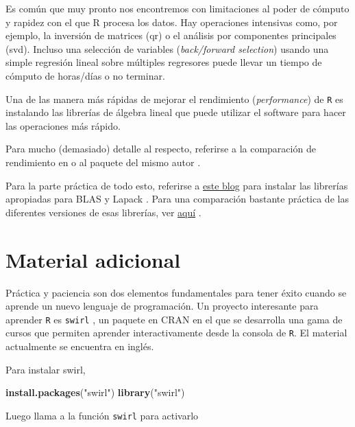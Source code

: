 \documentclass[]{article}
\newenvironment{Shaded}{\begin{snugshade}}{\end{snugshade}}
\newcommand{\KeywordTok}[1]{\textcolor[rgb]{0.13,0.29,0.53}{\textbf{#1}}}
\newcommand{\StringTok}[1]{\textcolor[rgb]{0.31,0.60,0.02}{#1}}
\newcommand{\NormalTok}[1]{#1}
\begin{document}
Es común que muy pronto nos encontremos con limitaciones al poder de
cómputo y rapidez con el que R procesa los datos. Hay operaciones
intensivas como, por ejemplo, la inversión de matrices (qr) o el
análisis por componentes principales (svd). Incluso una selección de
variables (\emph{back/forward selection}) usando una simple regresión
lineal sobre múltiples regresores puede llevar un tiempo de cómputo de
horas/días o no terminar.

Una de las manera más rápidas de mejorar el rendimiento
(\emph{performance}) de \texttt{R} es instalando las librerías de
álgebra lineal que puede utilizar el software para hacer las operaciones
más rápido.

Para mucho (demasiado) detalle al respecto, referirse a la comparación
de rendimiento en \textcite{eddelbuettel2010} o al paquete del mismo
autor \textcite{gcbd}.

Para la parte práctica de todo esto, referirse a
\href{http://brettklamer.com/diversions/statistical/faster-blas-in-r/}{este
blog} para instalar las librerías apropiadas para BLAS y Lapack
\parencite{blasinr}. Para una comparación bastante práctica de las
diferentes versiones de esas librerías, ver
\href{http://blog.nguyenvq.com/blog/2014/11/10/optimized-r-and-python-standard-blas-vs-atlas-vs-openblas-vs-mkl/}{aquí}
\parencite{optimizedr}.

\section{Material adicional}\label{material-adicional}

Práctica y paciencia son dos elementos fundamentales para tener éxito
cuando se aprende un nuevo lenguaje de programación. Un proyecto
interesante para aprender \texttt{R} es \texttt{swirl}
\parencite{swirl}, un paquete en CRAN en el que se desarrolla una gama
de cursos que permiten aprender interactivamente desde la consola de
\texttt{R}. El material actualmente se encuentra en inglés.

Para instalar swirl,

\begin{Shaded}
\begin{Highlighting}[]
\KeywordTok{install.packages}\NormalTok{(}\StringTok{"swirl"}\NormalTok{)}
\KeywordTok{library}\NormalTok{(}\StringTok{"swirl"}\NormalTok{)}
\end{Highlighting}
\end{Shaded}

Luego llama a la función \texttt{swirl} para activarlo
\end{document}
